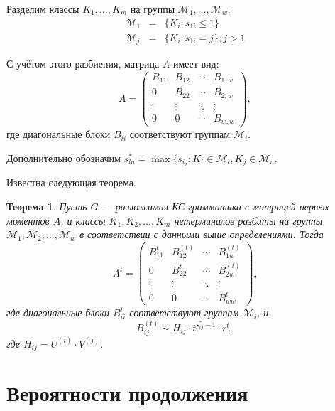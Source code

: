 \documentclass[12pt]{article}
\newtheorem{theorem}{Теорема}
\begin{document}
Разделим классы $K_1, \ldots, K_m$ на группы $\mathcal{M}_1, \ldots, \mathcal{M}_w$:
\begin{equation}
	\begin{array}{lcl}
		\mathcal{M}_1 & = & \{K_i : s_{1i} \leq 1 \} \\
		\mathcal{M}_j & = & \{K_i : s_{1i} = j \}, j > 1
	\end{array}
\end{equation}

С учётом этого разбиения, матрица $A$ имеет вид:
\begin{equation}
	A =
	\begin{pmatrix}
		B_{11} & B_{12} & \cdots & B_{1,w} \\
		0 & B_{22} & \cdots & B_{2,w} \\
		\vdots & \vdots & \ddots & \vdots \\
		0 & 0 & \cdots & B_{w,w}
	\end{pmatrix},
\end{equation}
где диагональные блоки $B_{ii}$ соответствуют группам $\mathcal{M}_i$.

Дополнительно обозначим $s_{ln}^* = \max \{s_{ij} : K_i \in \mathcal{M}_l, K_j \in \mathcal{M}_n$.

Известна \cite{zhiltsova-about-matrix} следующая теорема.

\begin{theorem}
	Пусть $G$ --- разложимая КС-грамматика с матрицей первых моментов $A$, и классы $K_1, K_2, \ldots, K_m$ нетерминалов разбиты на группы $\mathcal{M}_1, \mathcal{M}_2, \ldots, \mathcal{M}_w$ в соответствии с данными выше определениями. Тогда
	\begin{equation}
		A^t =
		\begin{pmatrix}
			B_{11}^t & B_{12}^{(t)} & \cdots & B_{1w}^{(t)} \\
			0 & B_{22}^t & \cdots & B_{2w}^{(t)} \\
			\vdots & \vdots & \ddots & \vdots \\
			0 & 0 & \cdots & B_{ww}^t
		\end{pmatrix},
	\end{equation}
	где диагональные блоки $B_{ii}^t$ соответствуют группам $\mathcal{M}_i$, и
	\begin{equation}
		B_{ij}^{(t)} \sim H_{ij} \cdot t^{s_{ij}^* - 1} \cdot r^t,
	\end{equation}
	где $H_{ij} = U^{(i)} \cdot V^{(j)}$.
\end{theorem}

\section{Вероятности продолжения}
\end{document}
